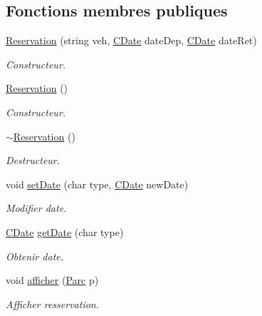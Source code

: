 \subsection*{Fonctions membres publiques}
\begin{DoxyCompactItemize}
\item 
\hyperlink{class_reservation_ac7957aefcd95b0f9a36fa07f377a1072}{Reservation} (string veh, \hyperlink{class_c_date}{CDate} dateDep, \hyperlink{class_c_date}{CDate} dateRet)
\begin{DoxyCompactList}\small\item\em Constructeur. \item\end{DoxyCompactList}\item 
\hyperlink{class_reservation_a63b283053695e6f50fa44c50da2b3de5}{Reservation} ()
\begin{DoxyCompactList}\small\item\em Constructeur. \item\end{DoxyCompactList}\item 
\hyperlink{class_reservation_abf387b06b84f8a12c8e2e95d431d3d60}{$\sim$Reservation} ()
\begin{DoxyCompactList}\small\item\em Destructeur. \item\end{DoxyCompactList}\item 
void \hyperlink{class_reservation_ac72f95402ed4b92c2625ac8b546e95d0}{setDate} (char type, \hyperlink{class_c_date}{CDate} newDate)
\begin{DoxyCompactList}\small\item\em Modifier date. \item\end{DoxyCompactList}\item 
\hyperlink{class_c_date}{CDate} \hyperlink{class_reservation_ab03159e8f06b63e5dcd2f10ec637f1f8}{getDate} (char type)
\begin{DoxyCompactList}\small\item\em Obtenir date. \item\end{DoxyCompactList}\item 
void \hyperlink{class_reservation_a2760e98de6bd2b8c5259526962227a52}{afficher} (\hyperlink{class_parc}{Parc} p)
\begin{DoxyCompactList}\small\item\em Afficher resservation. \item\end{DoxyCompactList}\item 

\end{DoxyCompactItemize}
